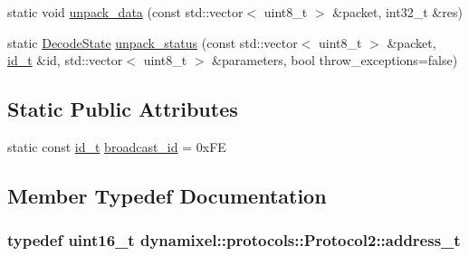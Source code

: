 \begin{DoxyCompactItemize}
\item 
static void \hyperlink{classdynamixel_1_1protocols_1_1_protocol2_aa9d44d665a21833f29b438efaec5d30f}{unpack\+\_\+data} (const std\+::vector$<$ uint8\+\_\+t $>$ \&packet, int32\+\_\+t \&res)
\item 
static \hyperlink{classdynamixel_1_1protocols_1_1_protocol2_ab779d109a8aeea8e2de436f6d23b43ed}{Decode\+State} \hyperlink{classdynamixel_1_1protocols_1_1_protocol2_adb5a8db2d554a4ee83f069f690d41f30}{unpack\+\_\+status} (const std\+::vector$<$ uint8\+\_\+t $>$ \&packet, \hyperlink{classdynamixel_1_1protocols_1_1_protocol2_a38d9cae72cd86213cca74e718c240429}{id\+\_\+t} \&id, std\+::vector$<$ uint8\+\_\+t $>$ \&parameters, bool throw\+\_\+exceptions=false)
\end{DoxyCompactItemize}
\subsection*{Static Public Attributes}
\begin{DoxyCompactItemize}
\item 
static const \hyperlink{classdynamixel_1_1protocols_1_1_protocol2_a38d9cae72cd86213cca74e718c240429}{id\+\_\+t} \hyperlink{classdynamixel_1_1protocols_1_1_protocol2_a1b0fd8890068abff759e758b27cf7869}{broadcast\+\_\+id} = 0x\+F\+E
\end{DoxyCompactItemize}


\subsection{Member Typedef Documentation}
\hypertarget{classdynamixel_1_1protocols_1_1_protocol2_ac5d0ba762aa1f860c0187d9e64982941}{}
\subsubsection[{address\+\_\+t}]{\setlength{\rightskip}{0pt plus 5cm}typedef uint16\+\_\+t {\bf dynamixel\+::protocols\+::\+Protocol2\+::address\+\_\+t}}\label{classdynamixel_1_1protocols_1_1_protocol2_ac5d0ba762aa1f860c0187d9e64982941}
\hypertarget{classdynamixel_1_1protocols_1_1_protocol2_a38d9cae72cd86213cca74e718c240429}{}
